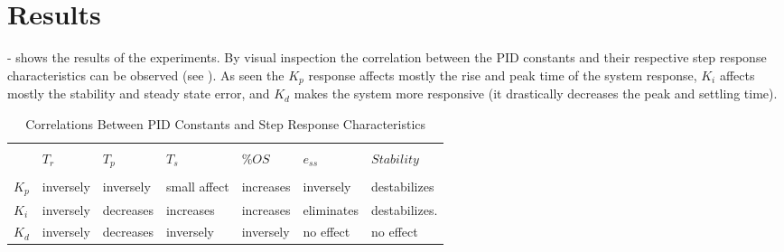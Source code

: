 \documentclass[main.tex]{subfile}
\begin{document}
\section{Results} 
\label{sec:results}

 -  shows the results of the
experiments. By visual inspection the correlation between the PID constants and
their respective step response characteristics can be observed (see
). As seen the $K_p$ response affects mostly the rise and
peak time of the system response, $K_i$ affects mostly the stability and steady
state error, and $K_d$ makes the system more responsive (it drastically
decreases the peak and settling time).

\begin{table}[H]
	\begin{tabularx}{\textwidth}{lXXXXXX}
		\toprule
		\\ & $T_r$ & $T_p$ & $T_s$ & $\%OS$ & $e_{ss}$ & $Stability$ 
		\\ \midrule
		\\ $K_p$ & inversely & inversely & small affect & increases  & inversely  & destabilizes
		\\ $K_i$ & inversely & decreases & increases & increases & eliminates & destabilizes.
		\\ $K_d$ & inversely & decreases & inversely & inversely & no effect & no effect
		\\ \bottomrule
	\end{tabularx}
	\caption{Correlations Between PID Constants and Step Response Characteristics}
	\label{tab:visualResults}
\end{table}



\end{document}
